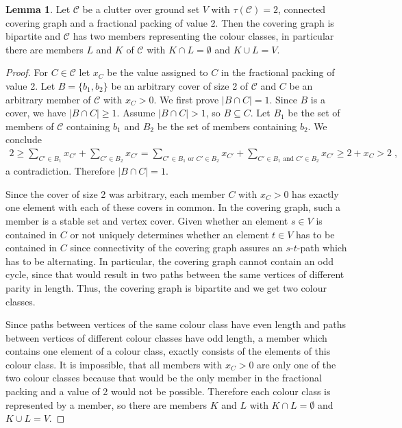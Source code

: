 \documentclass[a4paper, 12pt, twoside=false]{scrbook}
\theoremstyle{definition}
\newtheorem{lemma}[theorem]{Lemma}
\begin{document}
   \begin{lemma}\label{bipartite}
       Let $\mathcal{C}$ be a clutter over ground set $V$ with $\tau(\mathcal{C})=2$, connected covering graph and a fractional packing of value 2.
       Then the covering graph is bipartite and $\mathcal{C}$ has two members representing the colour classes, in particular there are members $L$ and $K$ of $\mathcal{C}$ with $K \cap L = \emptyset$ and $K \cup L = V$.
   \end{lemma}

   \begin{proof}
       For $C \in \mathcal{C}$ let $x_C$ be the value assigned to $C$ in the fractional packing of value 2.
       Let $B=\{b_1,b_2\}$ be an arbitrary cover of size 2 of $\mathcal{C}$ and $C$ be an arbitrary member of $\mathcal{C}$ with $x_{C} > 0$.
       We first prove $|B\cap C| = 1$.
       Since $B$ is a cover, we have $|B\cap C| \geq 1$.
       Assume $|B \cap C| > 1$, so $B \subseteq C$.
       Let $B_1$ be the set of members of $\mathcal{C}$ containing $b_1$ and $B_2$ be the set of members containing $b_2$.
       We conclude
       \begin{align*}
           2 \geq \sum_{C'\in B_1} x_{C'} + \sum_{C' \in B_2} x_{C'} = \sum_{C' \in B_1 \text{ or } C' \in B_2} x_{C'} + \sum_{C' \in B_1 \text{ and } C' \in B_2} x_{C'} \geq 2 + x_C > 2 \;,
       \end{align*}
       a contradiction. Therefore $|B\cap C| = 1$.

       Since the cover of size 2 was arbitrary, each member $C$ with $x_C>0$ has exactly one element with each of these covers in common.
       In the covering graph, such a member is a stable set and vertex cover.
       Given whether an element $s \in V$ is contained in $C$ or not uniquely determines whether an element $t \in V$ has to be contained in $C$ since connectivity of the covering graph assures an $s$-$t$-path which has to be alternating.
       In particular, the covering graph cannot contain an odd cycle, since that would result in two paths between the same vertices of different parity in length. Thus, the covering graph is bipartite and we get two colour classes.

       Since paths between vertices of the same colour class have even length and paths between vertices of different colour classes have odd length, a member which contains one element of a colour class, exactly consists of the elements of this colour class.
       It is impossible, that all members with $x_C > 0$ are only one of the two colour classes because that would be the only member in the fractional packing and a value of 2 would not be possible.
       Therefore each colour class is represented by a member, so there are members $K$ and $L$ with $K \cap L = \emptyset$ and $K \cup L = V$.

   \end{proof}
\end{document}
